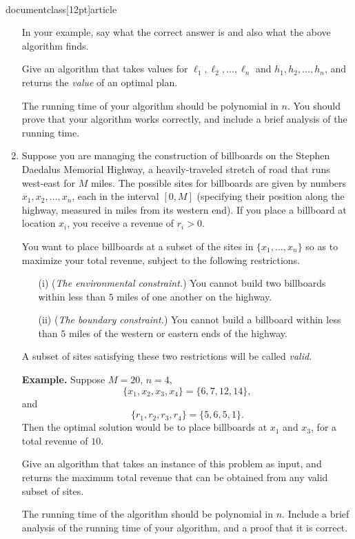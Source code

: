 \\documentclass[12pt]{article}
\begin{document}
\begin{enumerate}
In your example, say what the correct answer is and
also what the above algorithm finds.


Give an algorithm that takes values for
$\ell_1, \ell_2, \ldots, \ell_n$ and $h_1, h_2, \ldots, h_n$,
and returns the {\em value} of an optimal plan.

The running time of your algorithm should be polynomial in $n$.
You should prove that your algorithm works correctly, and include a
brief analysis of the running time.





\item

Suppose you are managing the construction of billboards
on the Stephen Daedalus Memorial Highway,
a heavily-traveled stretch of road that runs west-east for $M$ miles.
The possible sites for billboards are given
by numbers $x_1, x_2, \ldots, x_n$, each in
the interval $[0,M]$ (specifying their position
along the highway, measured in miles from its western end).
If you place a billboard at location $x_i$,
you receive a revenue of $r_i > 0.$

You want to place billboards at a subset of the sites
in $\{x_1, \ldots, x_n\}$
so as to maximize your total revenue, subject to the
following restrictions.
\begin{itemize}
\item[(i)] ({\em The environmental constraint.})
You cannot build two billboards within less than
$5$ miles of one another on the highway.
\item[(ii)] ({\em The boundary constraint.})
You cannot build a billboard within less than
$5$ miles of the western or eastern ends of the highway.
\end{itemize}
A subset of sites satisfying these two
restrictions will be called {\em valid.}

\medskip
{\bf Example.}
Suppose $M = 20$, $n = 4$,
$$\{x_1, x_2, x_3, x_4\} = \{6, 7, 12, 14\},$$ and
$$\{r_1, r_2, r_3, r_4\} = \{5, 6, 5, 1\}.$$
Then the optimal solution would be
to place billboards at $x_1$ and $x_3$, for
a total revenue of $10$.

\medskip
Give an algorithm that takes an instance
of this problem as input, and returns
the maximum total revenue that can be obtained
from any valid subset of sites.

The running time of the algorithm should be polynomial in $n$.
Include a brief analysis of the running time of your algorithm, and
a proof that it is correct.



\end{enumerate}
\end{document}
